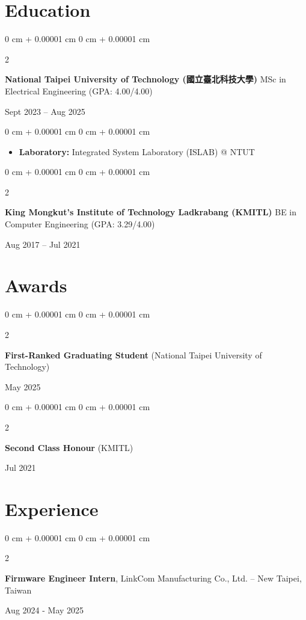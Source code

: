 \documentclass[10pt, a4paper]{article}
\newenvironment{highlights}{
    \begin{itemize}[
        topsep=0.10 cm,
        parsep=0.10 cm,
        partopsep=0pt,
        itemsep=0pt,
        leftmargin=0 cm + 10pt
    ]
}{
    \end{itemize}
} %
\newenvironment{onecolentry}{
    \begin{adjustwidth}{
        0 cm + 0.00001 cm
    }{
        0 cm + 0.00001 cm
    }
}{
    \end{adjustwidth}
} %
\newenvironment{twocolentry}[2][]{
    \onecolentry
    \def\secondColumn{#2}
    \setcolumnwidth{\fill, 4.5 cm}
    \begin{paracol}{2}
}{
    \switchcolumn \raggedleft \secondColumn
    \end{paracol}
    \endonecolentry
} %
\begin{document}
\section{Education}
\begin{twocolentry}{
		Sept 2023 – Aug 2025
	}
	\textbf{National Taipei University of Technology (國立臺北科技大學)}
	\newline
	MSc in Electrical Engineering (GPA: 4.00/4.00)
\end{twocolentry}

\begin{onecolentry}
	\begin{highlights}
		\item \textbf{Laboratory:} Integrated System Laboratory (ISLAB) @ NTUT
	\end{highlights}
\end{onecolentry}

\vspace{0.10 cm}

\begin{twocolentry}{
		Aug 2017 – Jul 2021
	}
	\textbf{King Mongkut's Institute of Technology Ladkrabang (KMITL)}
	\newline
	BE in Computer Engineering (GPA: 3.29/4.00)
\end{twocolentry}

\section{Awards}
\begin{twocolentry}{
		May 2025
	}
	\textbf{First-Ranked Graduating Student} (National Taipei University of Technology)
\end{twocolentry}
\begin{twocolentry}{
		Jul 2021
	}
	\textbf{Second Class Honour} (KMITL)
\end{twocolentry}





\section{Experience}

\begin{twocolentry}{
		Aug 2024 - May 2025
	}
	\textbf{Firmware Engineer Intern}, LinkCom Manufacturing Co., Ltd. -- New Taipei, Taiwan
\end{twocolentry}
\end{document}

